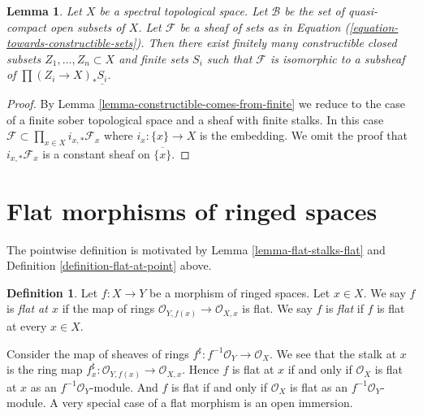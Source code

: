 \documentclass{stacks-project}
\theoremstyle{plain}
\newtheorem{lemma}[subsection]{Lemma}
\theoremstyle{definition}
\newtheorem{definition}[subsection]{Definition}
\theoremstyle{remark}
\numberwithin{equation}{subsection}
\begin{document}
\begin{lemma}
\label{lemma-constructible-in-constant}
Let $X$ be a spectral topological space. Let $\mathcal{B}$ be
the set of quasi-compact open subsets of $X$.
Let $\mathcal{F}$ be a sheaf of sets as in
Equation (\ref{equation-towards-constructible-sets}).
Then there exist finitely many constructible closed subsets
$Z_1, \ldots, Z_n \subset X$ and finite sets $S_i$
such that $\mathcal{F}$ is isomorphic to a subsheaf of
$\prod (Z_i \to X)_*\underline{S_i}$.
\end{lemma}

\begin{proof}
By Lemma \ref{lemma-constructible-comes-from-finite}
we reduce to the case of a finite sober topological space
and a sheaf with finite stalks.
In this case $\mathcal{F} \subset \prod_{x \in X} i_{x, *}\mathcal{F}_x$
where $i_x : \{x\} \to X$ is the embedding. We omit the proof
that $i_{x, *}\mathcal{F}_x$ is a constant sheaf on $\overline{\{x\}}$.
\end{proof}










\section{Flat morphisms of ringed spaces}
\label{section-flat-morphisms}

\noindent
The pointwise definition is motivated by
Lemma \ref{lemma-flat-stalks-flat}
and
Definition \ref{definition-flat-at-point}
above.

\begin{definition}
\label{definition-flat-morphism}
Let $f : X \to Y$ be a morphism of ringed spaces.
Let $x \in X$. We say $f$ is {\it flat at $x$}
if the map of rings $\mathcal{O}_{Y, f(x)} \to \mathcal{O}_{X, x}$ is flat.
We say $f$ is {\it flat} if $f$ is flat at every $x \in X$.
\end{definition}

\noindent
Consider the map of sheaves of rings
$f^\sharp : f^{-1}\mathcal{O}_Y \to \mathcal{O}_X$.
We see that the stalk at $x$ is the ring map
$f^\sharp_x : \mathcal{O}_{Y, f(x)} \to \mathcal{O}_{X, x}$.
Hence $f$ is flat at $x$ if and only if $\mathcal{O}_X$ is flat at $x$
as an $f^{-1}\mathcal{O}_Y$-module. And $f$ is flat if and only if
$\mathcal{O}_X$ is flat as an $f^{-1}\mathcal{O}_Y$-module.
A very special case of a flat morphism is an open immersion.
\end{document}
